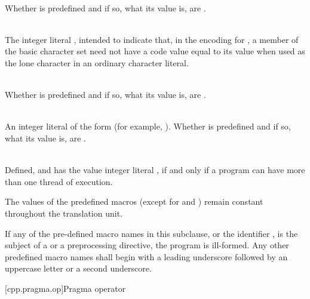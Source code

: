 \begin{description}
\item
{}%
\\
Whether  is predefined and if so, what its value is,
are .

\item
{}%
\\
The integer literal , intended to indicate that, in the encoding for
, a member of the basic character set need not have a code value equal to
its value when used as the lone character in an ordinary character literal.

\item
{}%
\\
Whether  is predefined and if so, what its value is,
are .

\item
{}%
\\
An integer literal of the form 
(for example, ).
Whether  is predefined and
if so, what its value is,
are .

\item
{}%
\\
Defined, and has the value integer literal , if and only if a program
can have more than one thread of execution.

\end{description}

\pnum
The values of the predefined macros
(except for
and
)
remain constant throughout the translation unit.

\pnum
If any of the pre-defined macro names in this subclause,
or the identifier
,
is the subject of a
or a
preprocessing directive,
the program is ill-formed.
Any other predefined macro names shall begin with a
leading underscore followed by an uppercase letter or a second
underscore.

[cpp.pragma.op]{Pragma operator}%
%

